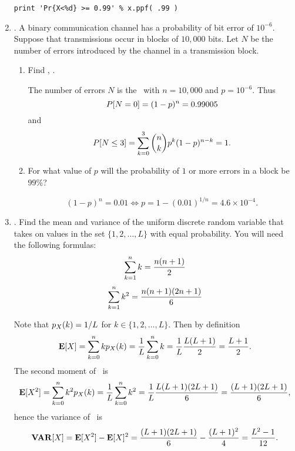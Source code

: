\begin{enumerate}
\begin{pcode}
\begin{verbatim}
print 'Pr{X<%d} >= 0.99' % x.ppf( .99 )
\end{verbatim}
\end{pcode}
\fi


	\item {}.
	A binary communication channel has a probability of bit error of $10^{-6}$.
	Suppose that transmissions occur in blocks of $10,000$ bits.
	Let $N$ be the number of errors introduced by the channel in a transmission block.
	\begin{enumerate}
		\item Find , .
		\ifdefined\sol
		\begin{solution}
			The number of errors $N$ is the \binomrv\
			with $n=10,000$ and $p=10^{-6}$.
			Thus
			\[
				P[N=0] = (1-p)^n = 0.99005
			\]
			and
			\[
				P[N\leq 3] = \sum_{k=0}^{3} {{n} \choose {k}} p^k(1-p)^{n-k}
				= 1.
			\]
		\end{solution}
		\fi

		\item For what value of $p$ will the probability of $1$ or more errors in a block be
		$99$\%?
		\ifdefined\sol
		\begin{solution}
			\[
				(1-p)^n = 0.01
				\Leftrightarrow
				p = 1- (0.01)^{1/n}
				= 4.6 \times 10^{-4}.
			\]
		\end{solution}
		\fi

	\end{enumerate}

	\item \lgprob{3.68}.
	Find the mean and variance of the uniform discrete random variable that takes
	on values in the set $\{1,2,\ldots,L\}$ with equal probability.
	You will need the following formulas:
	\[ \sum_{k=1}^{n} k = \frac{n(n+1)}{2} \]
	\[ \sum_{k=1}^{n} k^2 = \frac{n(n+1)(2n+1)}{6}  \]
	\ifdefined\sol
	\begin{solution}
		Note that $p_{X}(k) = 1/L$ for $k\in\{1,2,\ldots,L\}$.
		Then by definition
		\[
			{\bf E}[X] =
			\sum_{k=0}^{n} k p_{X}(k) =
			\frac{1}{L} \sum_{k=0}^{n} k =
			\frac{1}{L} \frac{L(L+1)}{2} =
			\frac{L+1}{2}.
		\]
		The second moment of \X\ is
		\[
			{\bf E}[X^2] =
			\sum_{k=0}^{n} k^2 p_{X}(k) =
			\frac{1}{L} \sum_{k=0}^{n} k^2 =
			\frac{1}{L} \frac{L(L+1)(2L+1)}{6} =
			\frac{(L+1)(2L+1)}{6},
		\]
		hence the variance of \X\ is
		\[
			{\bf VAR}[X] =
			{\bf E}[X^2] - {\bf E}[X]^2 =
			\frac{(L+1)(2L+1)}{6} - \frac{(L+1)^2}{4}
			=\frac{L^2-1}{12}.
			\]
	\end{solution}
	\fi


\end{enumerate}

